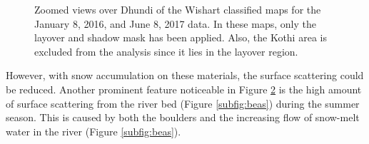 \documentclass[12pt]{elsarticle}
\numberwithin{equation}{section}
\numberwithin{figure}{section}
\numberwithin{table}{section}
\begin{document}
\begin{figure}[!ht]
    \centering
    \begin{subfigure}[t]{\textwidth}
        \caption{}
        \label{subfig:wishart_jan}
    \end{subfigure}
    \begin{subfigure}[t]{\textwidth}
        \caption{}
        \label{subfig:wishart_jun}
    \end{subfigure}
    \caption{Zoomed views over Dhundi of the Wishart classified maps for the  January 8, 2016, and  June 8, 2017 data. In these maps, only the layover and shadow mask has been applied. Also, the Kothi area is excluded from the analysis since it lies in the layover region.}
    \label{fig:wishart_res}
\end{figure}

However, with snow accumulation on these materials, the surface scattering could be reduced. Another prominent feature noticeable in Figure \ref{subfig:wishart_jun} is the high amount of surface scattering from the river bed (Figure \ref{subfig:beas}) during the summer season. This is caused by both the boulders and the increasing flow of snow-melt water in the river (Figure \ref{subfig:beas}).
\end{document}
